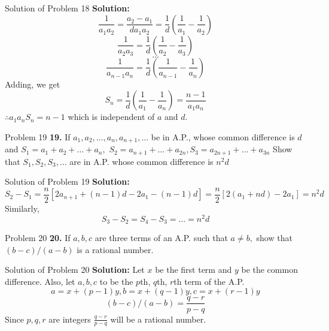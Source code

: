 \documentclass[aspectratio=1610,8pt]{beamer}
\begin{document}
\begin{frame}{Solution of Problem 18}
  \textbf{Solution:} $$\frac{1}{a_1a_2} = \frac{a_2 - a_1}{da_1a_2} = \frac{1}{d}\left(\frac{1}{a_1} - \frac{1}{a_2}\right)$$
  $$\frac{1}{a_2a_3} = \frac{1}{d}\left(\frac{1}{a_2} - \frac{1}{a_3}\right)$$
  $$\ldots$$
  $$\frac{1}{a_{n - 1}a_n} = \frac{1}{d}\left(\frac{1}{a_{n - 1}} - \frac{1}{a_n}\right)$$
  Adding, we get
  $$S_n = \frac{1}{d}\left(\frac{1}{a_1} - \frac{1}{a_n}\right) = \frac{n - 1}{a_1a_n}$$
  $\therefore a_1a_nS_n = n - 1$ which is independent of $a$ and $d.$
\end{frame}
\begin{frame}{Problem 19}
  \textbf{19.} If $a_1, a_2, \ldots, a_n, a_{n + 1}, \ldots$ be in A.P., whose common difference is $d$ and $S_1 = a_1 + a_2 +
  \ldots + a_n,$ $S_2 = a_{n + 1} + \ldots + a_{2n}, S_3 = a_{2n + 1} + \ldots + a_{3n}$ Show that $S_1, S_2, S_3, \ldots$ are in
  A.P. whose common difference is $n^2d$
\end{frame}
\begin{frame}{Solution of Problem 19}
  \textbf{Solution:}$$S_2 - S_1 = \frac{n}{2}[2a_{n + 1} + (n - 1)d - 2a_1 - (n - 1)d] = \frac{n}{2}[2(a_1 + nd) - 2a_1] = n^2d$$
  Similarly, $$S_3 - S_2 = S_4 - S_3 = \ldots = n^2d$$
\end{frame}
\begin{frame}{Problem 20}
  \textbf{20.} If $a, b, c$ are three terms of an A.P. such that $a\neq b,$ show that $(b - c)/(a - b)$ is a rational number.
\end{frame}
\begin{frame}{Solution of Problem 20}
  \textbf{Solution:} Let $x$ be the first term and $y$ be the common difference. Also, let $a, b, c$ to be the $p$th, $q$th, $r$th
  term of the A.P.
  \linebreak\linebreak
  $$a = x + (p - 1)y, b = x + (q - 1)y, c = x + (r - 1)y$$
  $$(b - c)/(a - b) = \frac{q - r}{p - q}$$
  Since $p, q, r$ are integers $\frac{q - r}{p - q}$ will be a rational number.
\end{frame}
\end{document}
